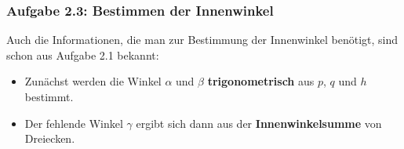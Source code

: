 \documentclass
[
  fontsize = 10pt,
  compress = true,
  ngerman,
  dvipsnames
]
{beamer}
\begin{document}
\renewcommand{\sectiontitle}{Aufgabe 2.3: Bestimmen der Innenwinkel}

\begin{frame}
  \frametitle{\sectiontitle}
  Auch die Informationen, die man zur Bestimmung der Innenwinkel benötigt,
  sind schon aus Aufgabe 2.1 bekannt:
  \begin{itemize}
    \item Zunächst werden die Winkel $\alpha$ und $\beta$
          \textbf{trigonometrisch} aus $p$, $q$ und $h$ bestimmt.
    \item Der fehlende Winkel $\gamma$ ergibt sich dann aus
          der \textbf{Innenwinkelsumme} von Dreiecken.
  \end{itemize}
\end{frame}
\end{document}
